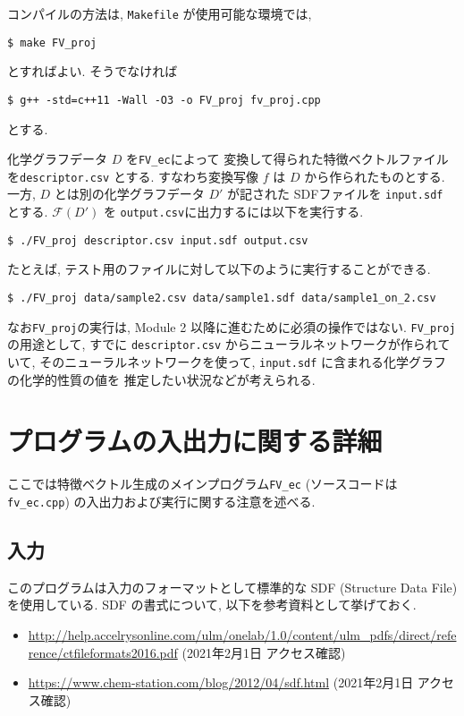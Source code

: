 \documentclass[11pt, titlepage, dvipdfmx, twoside]{jarticle}
\begin{document}
コンパイルの方法は, {\tt Makefile} が使用可能な環境では, 
\begin{oframed}
{\small
\verb|$ make FV_proj|
}
\end{oframed}
とすればよい. そうでなければ
\begin{oframed}
{\small
\verb|$ g++ -std=c++11 -Wall -O3 -o FV_proj fv_proj.cpp|
}
\end{oframed}
とする.

化学グラフデータ $D$ を{\tt FV\_ec}によって
変換して得られた特徴ベクトルファイルを{\tt descriptor.csv}
とする. すなわち変換写像 $f$ は $D$ から作られたものとする. 
一方, $D$ とは別の化学グラフデータ $D'$ が記された
SDFファイルを {\tt input.sdf} とする.
${\mathcal F}(D')$ を {\tt output.csv}に出力するには以下を実行する.  
\begin{oframed}
{\small
\verb|$ ./FV_proj descriptor.csv input.sdf output.csv|
}
\end{oframed}

たとえば, テスト用のファイルに対して以下のように実行することができる. 
\begin{oframed}
{\small
\verb|$ ./FV_proj data/sample2.csv data/sample1.sdf data/sample1_on_2.csv|
}
\end{oframed}

なお{\tt FV\_proj}の実行は, Module 2 以降に進むために必須の操作ではない.
{\tt FV\_proj}の用途として,
すでに {\tt descriptor.csv} からニューラルネットワークが作られていて,
そのニューラルネットワークを使って, {\tt input.sdf} に含まれる化学グラフの化学的性質の値を
推定したい状況などが考えられる. 


\clearpage
\section{プログラムの入出力に関する詳細}
\label{sec:io}

ここでは特徴ベクトル生成のメインプログラム{\tt FV\_ec} (ソースコードは {\tt fv\_ec.cpp})
の入出力および実行に関する注意を述べる. 

\subsection{入力}

このプログラムは入力のフォーマットとして標準的な SDF (Structure Data File) を使用している.
SDF の書式について, 以下を参考資料として挙げておく. 
\begin{itemize}
\item \url{http://help.accelrysonline.com/ulm/onelab/1.0/content/ulm_pdfs/direct/reference/ctfileformats2016.pdf} (2021年2月1日 アクセス確認)
\item \url{https://www.chem-station.com/blog/2012/04/sdf.html} (2021年2月1日 アクセス確認)
\end{itemize}
\end{document}
